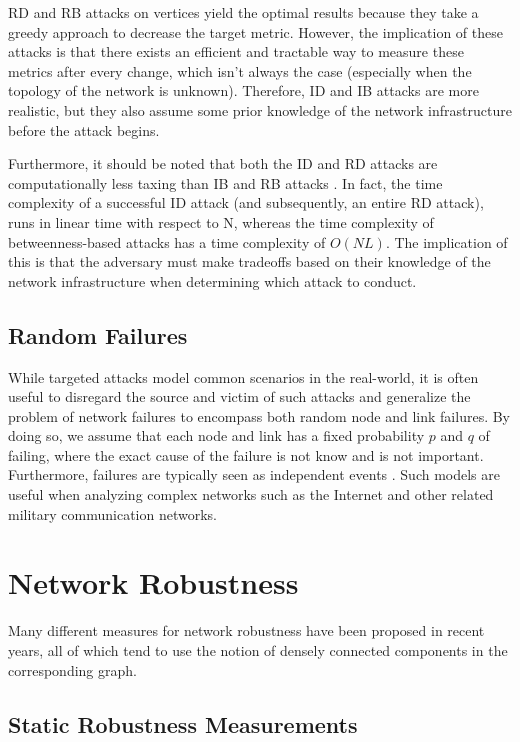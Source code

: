 \documentclass[doc]{apa}%
\begin{document}
RD and RB attacks on vertices yield the optimal results because they take a greedy approach to decrease the target metric. However, the implication of these attacks is that there exists an efficient and tractable way to measure these metrics after every change, which isn't always the case (especially when the topology of the network is unknown). Therefore, ID and IB attacks are more realistic, but they also assume some prior knowledge of the network infrastructure before the attack begins. 

Furthermore, it should be noted that both the ID and RD attacks are computationally less taxing than IB and RB attacks \cite{Attacks}. In fact, the time complexity of a successful ID attack (and subsequently, an entire RD attack), runs in linear time with respect to N, whereas the time complexity of betweenness-based attacks has a time complexity of $O(NL)$. The implication of this is that the adversary must make tradeoffs based on their knowledge of the network infrastructure when determining which attack to conduct.

\subsection{Random Failures}
\label{RandomFailures}
While targeted attacks model common scenarios in the real-world, it is often useful to disregard the source and victim of such attacks and generalize the problem of network failures to encompass both random node and link failures. By doing so, we assume that each node and link has a fixed probability $p$ and $q$ of failing, where the exact cause of the failure is not know and is not important. Furthermore, failures are typically seen as independent events \cite{RandomStudy}. Such models are useful when analyzing complex networks such as the Internet and other related military communication networks. 

\section{Network Robustness}

Many different measures for network robustness have been proposed in recent years, all of which tend
to use the notion of densely connected components in the corresponding graph. 


\subsection{Static Robustness Measurements}
\end{document}
